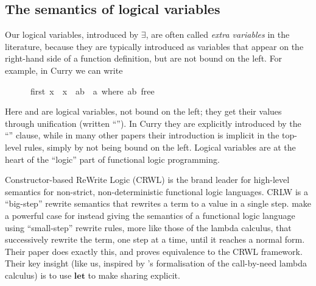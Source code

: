 \documentclass[acmsmall,review,dvipsnames]{acmart}
\begin{document}
\subsection{The semantics of logical variables} \label{sec:magical}

Our logical variables, introduced by \ensuremath{\exists}, are often called
\emph{extra variables} in the literature, because they
are typically introduced as variables that appear on the right-hand side of a function
definition, but are not bound on the left.  For example, in Curry we can write
\begin{tabbing}\ttfamily
~~~~~~first~x~~x~~ab~~a~where~ab~free
\end{tabbing}
Here  and  are logical variables, not bound on the left; they
get their values through unification (written ``'').   In Curry they are explicitly introduced
by the ``'' clause, while in many other papers their
introduction is implicit in the top-level rules, simply by not being bound
on the left.  Logical variables are
at the heart of the ``logic'' part of functional logic programming.

Constructor-based ReWrite Logic (CRWL) \cite{crwl} is the brand leader for
high-level semantics for non-strict, non-deterministic functional logic languages.
%
CRLW is a ``big-step'' rewrite semantics that rewrites a term to a value in a single
step.
%
 make a powerful case for instead giving the semantics
of a functional logic language using ``small-step'' rewrite rules, more like those
of the lambda calculus, that successively rewrite the term, one step at
a time, until it reaches a normal form.
Their paper does exactly this, and proves equivalence to the
CRWL framework.  Their key insight (like us, inspired by
\citet{ariola:call-by-need}'s formalisation of the call-by-need lambda calculus)
is to use \ensuremath{\mathbf{let}} to make sharing explicit.
\end{document}
